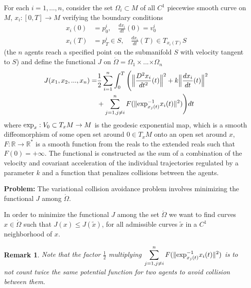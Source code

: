 \documentclass[letterpaper, 10 pt, conference]{ieeeconf}  %
\newtheorem{remarkth}[definition]{Remark}
\newenvironment{remark}{\begin{remarkth}\upshape}{\end{remarkth}}
\newcommand{\todo}[1]{
  \vspace{5mm}\par \noindent
  \marginpar{\textsc{ToDo}}
  \framebox{
    \begin{minipage}[c]{0.95\linewidth}
      \tt #1
    \end{minipage}
  }
  \vspace{5mm}\par
}
\begin{document}
For each $i=1,\ldots,n$, consider the set $\Omega_{i}\subset M$ of all $C^1$ piecewise smooth curve on $M$, $x_{i} : [0,T] \rightarrow M$ verifying the boundary conditions
%
\begin{align*}
x_i(0) &= p_{0}^{i}, \quad \frac{dx_i}{dt}(0) = v_{0}^{i} \\ x_i(T) &= p_T^i \in S, \quad \frac{dx_i}{dt}(T) \in T_{x_i(T)}S
\end{align*}
%
(the $n$ agents reach a specified point on the submanifold $S$ with velocity tangent to $S$)
and define the functional $J$ on $\acute{\Omega} = \Omega_{1}\times$...$\times\Omega_{n}$ 
%
\begin{align*}
J(x_1, x_2, ..., x_n) =& \frac{1}{2}\sum_{i=1}^{n} \int_{0}^{T} \Bigg( \Big{\|} \frac{D^2x_i}{dt^2}(t) \Big{\|}^2 + k\Big{\|}\frac{dx_i}{dt}(t)\Big{\|}^2  \\ &+  \sum_{j=1, j \neq i}^{n} F( \| \hbox{exp}_{x_j(t)}^{-1}x_i(t)\|^2)  \Bigg) dt
\end{align*} where $\hbox{exp}_{x} : V_{0} \subset T_{x}M \rightarrow M$ is the geodesic exponential map, which is a smooth diffeomorphism of some open set around $0 \in T_{x}M$ onto an open set around $x$, $ F : \mathbb{R} \rightarrow \mathbb{R}^{*}$ is a smooth function from the reals to the extended reals such that $F(0) = +\infty$.
The functional is constructed as the sum of a combination of the velocity and covariant acceleration of the individual trajectories regulated by a parameter $k$ and a function that penalizes collisions between the agents. 

\textbf{Problem:} The variational collision avoidance problem involves minimizing the functional $J$ among $\acute{\Omega}$. 


In order to minimize the functional $J$ among the set $\acute{\Omega}$ we want to find curves $x \in \acute{\Omega}$ such that $J(x) \leq J(\tilde{x})$, for all admissible curves $\tilde{x}$ in a $C^1$ neighborhood of $x$.

\begin{remark}
Note that the factor $\frac{1}{2}$ multiplying $\displaystyle{\sum_{j=1, j \neq i}^{n} F( \| \hbox{exp}_{x_j(t)}^{-1}x_i(t)\|^2)}$ is to not count twice the same potential function for two agents to avoid collision between them. %

\end{remark}
\end{document}
